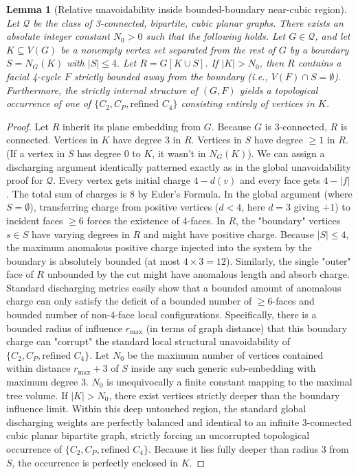 \documentclass[12pt]{article}
\newtheorem{lemma}[theorem]{Lemma}
\begin{document}
\begin{lemma}[Relative unavoidability inside bounded-boundary near-cubic region]
\label{lem:relative_unavoidability}
Let $\mathcal{Q}$ be the class of 3-connected, bipartite, cubic planar graphs.
There exists an absolute integer constant $N_0 > 0$ such that the following holds.
Let $G \in \mathcal{Q}$, and let $K \subseteq V(G)$ be a nonempty vertex set separated from the rest of $G$ by a boundary $S = N_G(K)$ with $|S| \le 4$.
Let $R = G[K \cup S]$.
If $|K| > N_0$, then $R$ contains a facial 4-cycle $F$ strictly bounded away from the boundary (i.e., $V(F) \cap S = \emptyset$). Furthermore, the strictly internal structure of $(G, F)$ yields a topological occurrence of one of $\{C_2, C_P, \text{refined } C_4\}$ consisting entirely of vertices in $K$.
\end{lemma}

\begin{proof}
Let $R$ inherit its plane embedding from $G$. Because $G$ is 3-connected, $R$ is connected.
Vertices in $K$ have degree 3 in $R$. Vertices in $S$ have degree $\ge 1$ in $R$. (If a vertex in $S$ has degree $0$ to $K$, it wasn't in $N_G(K)$).
We can assign a discharging argument identically patterned exactly as in the global unavoidability proof for $\mathcal{Q}$.
Every vertex gets initial charge $4-d(v)$ and every face gets $4-|f|$. The total sum of charges is 8 by Euler's Formula.
In the global argument (where $S = \emptyset$), transferring charge from positive vertices ($d<4$, here $d=3$ giving $+1$) to incident faces $\ge 6$ forces the existence of 4-faces.
In $R$, the "boundary" vertices $s \in S$ have varying degrees in $R$ and might have positive charge. Because $|S| \le 4$, the maximum anomalous positive charge injected into the system by the boundary is absolutely bounded (at most $4 \times 3 = 12$).
Similarly, the single "outer" face of $R$ unbounded by the cut might have anomalous length and absorb charge.
Standard discharging metrics easily show that a bounded amount of anomalous charge can only satisfy the deficit of a bounded number of $\ge 6$-faces and bounded number of non-4-face local configurations.
Specifically, there is a bounded radius of influence $r_\mathrm{max}$ (in terms of graph distance) that this boundary charge can "corrupt" the standard local structural unavoidability of $\{C_2, C_P, \text{refined } C_4\}$.
Let $N_0$ be the maximum number of vertices contained within distance $r_\mathrm{max}+3$ of $S$ inside any such generic sub-embedding with maximum degree 3. $N_0$ is unequivocally a finite constant mapping to the maximal tree volume.
If $|K| > N_0$, there exist vertices strictly deeper than the boundary influence limit. Within this deep untouched region, the standard global discharging weights are perfectly balanced and identical to an infinite 3-connected cubic planar bipartite graph, strictly forcing an uncorrupted topological occurrence of $\{C_2, C_P, \text{refined } C_4\}$. Because it lies fully deeper than radius 3 from $S$, the occurrence is perfectly enclosed in $K$.
\end{proof}
\end{document}
